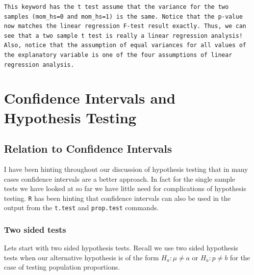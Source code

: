 \documentclass[
]{book}
\newenvironment{Shaded}{\begin{snugshade}}{\end{snugshade}}
\newcommand{\AttributeTok}[1]{\textcolor[rgb]{0.77,0.63,0.00}{#1}}
\newcommand{\ConstantTok}[1]{\textcolor[rgb]{0.00,0.00,0.00}{#1}}
\newcommand{\FunctionTok}[1]{\textcolor[rgb]{0.00,0.00,0.00}{#1}}
\newcommand{\NormalTok}[1]{#1}
\newcommand{\SpecialCharTok}[1]{\textcolor[rgb]{0.00,0.00,0.00}{#1}}
\theoremstyle{definition}
\theoremstyle{definition}
\theoremstyle{definition}
\theoremstyle{definition}
\theoremstyle{remark}
\begin{document}
\begin{Shaded}
\end{Shaded}

\begin{verbatim}
This keyword has the t test assume that the variance for the two samples (mom_hs=0 and mom_hs=1) is the same. Notice that the p-value now matches the linear regression F-test result exactly. Thus, we can see that a two sample t test is really a linear regression analysis! Also, notice that the assumption of equal variances for all values of the explanatory variable is one of the four assumptions of linear regression analysis.  
\end{verbatim}

\hypertarget{confidence-intervals-and-hypothesis-testing}{%
\chapter{Confidence Intervals and Hypothesis Testing}\label{confidence-intervals-and-hypothesis-testing}}

\hypertarget{relation-to-confidence-intervals}{%
\section{Relation to Confidence Intervals}\label{relation-to-confidence-intervals}}

I have been hinting throughout our discussion of hypothesis testing that in many cases confidence intervals are a better approach. In fact for the single sample tests we have looked at so far we have little need for complications of hypothesis testing. \texttt{R} has been hinting that confidence intervals can also be used in the output from the \texttt{t.test} and \texttt{prop.test} commands.

\hypertarget{two-sided-tests}{%
\subsection{Two sided tests}\label{two-sided-tests}}

Lets start with two sided hypothesis tests. Recall we use two sided hypothesis tests when our alternative hypothesis is of the form \(H_a: \mu \neq a\) or \(H_a: p \neq b\) for the case of testing population proportions.
\end{document}
